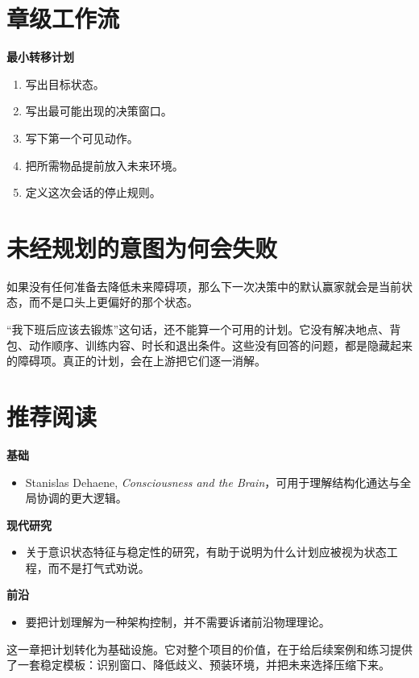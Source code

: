 \section{章级工作流}

\begin{templatebox}
\textbf{最小转移计划}
\begin{enumerate}[nosep]
  \item 写出目标状态。
  \item 写出最可能出现的决策窗口。
  \item 写下第一个可见动作。
  \item 把所需物品提前放入未来环境。
  \item 定义这次会话的停止规则。
\end{enumerate}
\end{templatebox}

\section{未经规划的意图为何会失败}

\begin{corollary}[未经规划的行动者会追随当前惯性]
如果没有任何准备去降低未来障碍项，那么下一次决策中的默认赢家就会是当前状态，而不是口头上更偏好的那个状态。
\end{corollary}

\begin{example}[下班后锻炼]
“我下班后应该去锻炼”这句话，还不能算一个可用的计划。它没有解决地点、背包、动作顺序、训练内容、时长和退出条件。这些没有回答的问题，都是隐藏起来的障碍项。真正的计划，会在上游把它们逐一消解。
\end{example}

\section{推荐阅读}

\begin{readingbox}
\textbf{基础}
\begin{itemize}[nosep]
  \item Stanislas Dehaene, \emph{Consciousness and the Brain}，可用于理解结构化通达与全局协调的更大逻辑。
\end{itemize}
\textbf{现代研究}
\begin{itemize}[nosep]
  \item 关于意识状态特征与稳定性的研究，有助于说明为什么计划应被视为状态工程，而不是打气式劝说。
\end{itemize}
\textbf{前沿}
\begin{itemize}[nosep]
  \item 要把计划理解为一种架构控制，并不需要诉诸前沿物理理论。
\end{itemize}
\end{readingbox}

\begin{summarybox}
这一章把计划转化为基础设施。它对整个项目的价值，在于给后续案例和练习提供了一套稳定模板：识别窗口、降低歧义、预装环境，并把未来选择压缩下来。
\end{summarybox}
